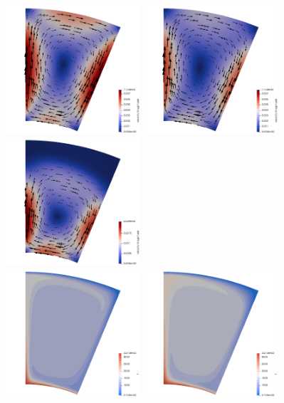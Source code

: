 \begin{figure}
  \centering
  \includegraphics[width=5cm]{cookbooks/plume_2D_chunk/doc/vel1}
  \includegraphics[width=5cm]{cookbooks/plume_2D_chunk/doc/vel2}
  \includegraphics[width=5cm]{cookbooks/plume_2D_chunk/doc/vel3}\\
  \includegraphics[width=5cm]{cookbooks/plume_2D_chunk/doc/T1}
  \includegraphics[width=5cm]{cookbooks/plume_2D_chunk/doc/T2}

\end{figure}
